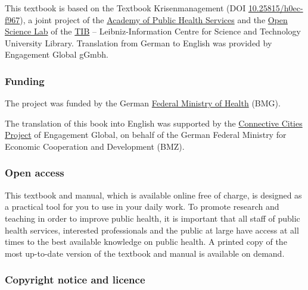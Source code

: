 \documentclass{article}
\begin{document}
This textbook is based on the Textbook Krisenmanagement (DOI \href{https://doi.org/10.25815/h0ec-f967}{10.25815/h0ec-f967}), a joint project of the \href{https://www.akademie-oegw.de/startseite.html}{Academy of Public Health Services} and the \href{https://www.tib.eu/en/research-development/open-science}{Open Science Lab} of the \href{https://www.tib.eu/}{TIB} – Leibniz-Information Centre for Science and Technology University Library. Translation from German to English was provided by Engagement Global gGmbh.


\subsubsection{Funding}\label{H1593607}



The project was funded by the German \href{https://www.bundesgesundheitsministerium.de/english-version.html}{Federal Ministry of Health} (BMG). 


The translation of this book into English was supported by the \href{https://skew.engagement-global.de/connective-cities.html}{Connective Cities Project} of Engagement Global, on behalf of the German Federal Ministry for Economic Cooperation and Development (BMZ).


\subsubsection{Open access}\label{H3712911}



This textbook and manual, which is available online free of charge, is designed as a practical tool for you to use in your daily work. To promote research and teaching in order to improve public health, it is important that all staff of public health services, interested professionals and the public at large have access at all times to the best available knowledge on public health. A printed copy of the most up-to-date version of the textbook and manual is available on demand.


\subsubsection{Copyright notice and licence}\label{H7708600}
\end{document}
